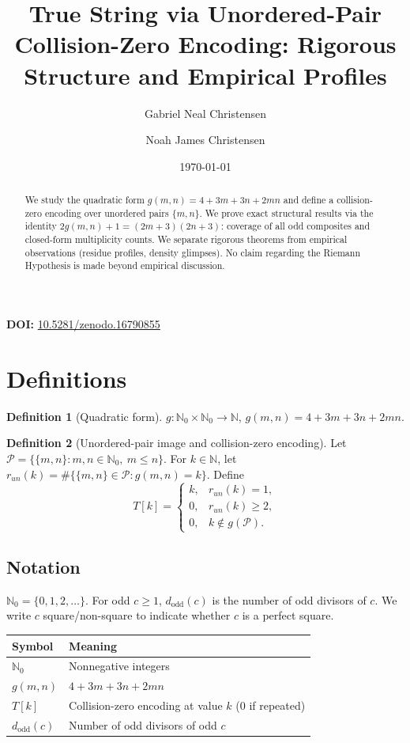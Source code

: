 \documentclass[12pt]{article}
\title{True String via Unordered-Pair Collision-Zero Encoding: Rigorous Structure and Empirical Profiles}
\author{Gabriel Neal Christensen \and Noah James Christensen}
\date{\today}
\theoremstyle{definition}
\newtheorem{definition}{Definition}[section]
\theoremstyle{plain}
\theoremstyle{remark}
\begin{document}
\maketitle
\noindent\textbf{DOI:} \href{https://doi.org/10.5281/zenodo.16790855}{10.5281/zenodo.16790855}

\begin{abstract}
We study the quadratic form \(g(m,n)=4+3m+3n+2mn\) and define a collision-zero encoding over unordered pairs \(\{m,n\}\). We prove exact structural results via the identity \(2g(m,n)+1=(2m+3)(2n+3)\): coverage of all odd composites and closed-form multiplicity counts. We separate rigorous theorems from empirical observations (residue profiles, density glimpses). No claim regarding the Riemann Hypothesis is made beyond empirical discussion.
\end{abstract}

\tableofcontents
\newpage

\section{Definitions}
\begin{definition}[Quadratic form]
\(g:\mathbb{N}_0\times\mathbb{N}_0\to\mathbb{N}\), \(g(m,n)=4+3m+3n+2mn\).
\end{definition}

\begin{definition}[Unordered-pair image and collision-zero encoding]
Let \(\mathcal{P}=\{\{m,n\}:m,n\in\mathbb{N}_0,\ m\le n\}\). For \(k\in\mathbb{N}\), let \(r_{un}(k)=\#\{\{m,n\}\in\mathcal{P}:g(m,n)=k\}\). Define
\[
T[k]=\begin{cases}k,& r_{un}(k)=1,\\0,& r_{un}(k)\ge 2,\\0,&k\notin g(\mathcal{P}).\end{cases}
\]
\end{definition}

\subsection*{Notation}
\(\mathbb{N}_0=\{0,1,2,\dots\}\). For odd \(c\ge 1\), \(d_{\mathrm{odd}}(c)\) is the number of odd divisors of \(c\). We write \(c\) square/non-square to indicate whether \(c\) is a perfect square.

\begin{center}
\begin{tabular}{l l}
Symbol & Meaning \\
\hline
\(\mathbb{N}_0\) & Nonnegative integers \\
\(g(m,n)\) & \(4+3m+3n+2mn\) \\
\(T[k]\) & Collision-zero encoding at value \(k\) (0 if repeated) \\
\(d_{\mathrm{odd}}(c)\) & Number of odd divisors of odd \(c\) \\
\end{tabular}
\end{center}
\end{document}
